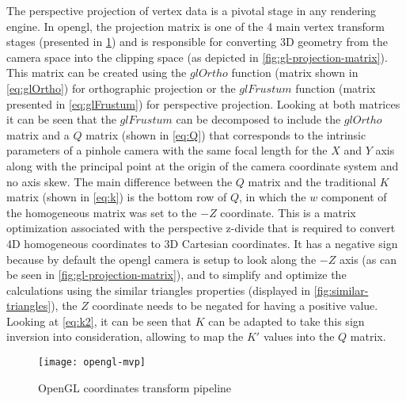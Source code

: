 The perspective projection of vertex data is a pivotal stage in any rendering engine. In \gls{opengl}, the projection matrix is one of the 4 main vertex transform stages (presented in \cref{fig:opengl-mvp}) and is responsible for converting 3D geometry from the camera space into the clipping space (as depicted in \cref{fig:gl-projection-matrix}). This matrix can be created using the $glOrtho$ function (matrix shown in \cref{eq:glOrtho}) for orthographic projection or the $glFrustum$ function (matrix presented in \cref{eq:glFrustum}) for perspective projection. Looking at both matrices it can be seen that the $glFrustum$ can be decomposed to include the $glOrtho$ matrix and a $Q$ matrix (shown in \cref{eq:Q}) that corresponds to the intrinsic parameters of a pinhole camera with the same focal length for the $X$ and $Y$ axis along with the principal point at the origin of the camera coordinate system and no axis skew. The main difference between the $Q$ matrix and the traditional $K$ matrix \cite{Hartley2003} (shown in \cref{eq:k}) is the bottom row of $Q$, in which the $w$ component of the homogeneous matrix was set to the $-Z$ coordinate. This is a matrix optimization associated with the perspective z-divide that is required to convert 4D homogeneous coordinates to 3D Cartesian coordinates. It has a negative sign because by default the \gls{opengl} camera is setup to look along the $-Z$ axis (as can be seen in \cref{fig:gl-projection-matrix}), and to simplify and optimize the calculations using the similar triangles properties (displayed in \cref{fig:similar-triangles}), the $Z$ coordinate needs to be negated for having a positive value. Looking at \cref{eq:k2}, it can be seen that $K$ can be adapted to take this sign inversion into consideration, allowing to map the $K'$ values into the $Q$ matrix.

\begin{figure}[H]
	\centering
	\texttt{[image: opengl-mvp]}
	\caption[OpenGL rendering pipeline]{OpenGL coordinates transform pipeline\protect\footnotemark}
	\label{fig:opengl-mvp}
	\vspace{-0.7em}
\end{figure}

